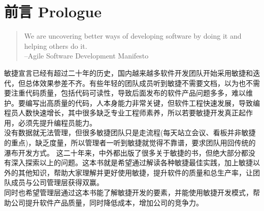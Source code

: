 \chapter*{前言 Prologue} %

\begin{quote}
We are uncovering better ways of developing software by doing it and helping others do it.\\
--Agile Software Development Manifesto
\end{quote}

敏捷宣言已经有超过二十年的历史，国内越来越多软件开发团队开始采用敏捷和迭代，但总体效果参差不齐。有些年轻的团队成员听到敏捷不需要文档，以为也不需要注重代码质量，包括代码可读性，导致后面发布的软件产品问题多多，难以维护。要编写出高质量的代码，人本身能力非常关键，但软件工程快速发展，导致编程员人数快速增长，其中很多缺乏专业工程师素养，所以若要敏捷开发真正起作用，必须先提升编程员能力。\\
没有数据就无法管理，但很多敏捷团队只是走流程(每天站立会议、看板并非敏捷的重点)，缺乏度量，所以管理者一听到敏捷就觉得不靠谱，要求团队用回传统的瀑布开发方式。 这二十年来，中外都出版了很多关于敏捷的书，但绝大部分都没有深入探索以上的问题。这本书就是希望通过解读各种敏捷最佳实践，加上敏捷以外的其他知识，帮助大家理解并更好使用敏捷，提升软件的质量和总生产率，让团队成员与公司管理层获得双赢。\\
同时也希望管理层通过这本书能了解敏捷开发的要素，并能使用敏捷开发模式，帮助公司提升软件产品质量，同时降低成本，增加公司的竞争力。 \\


